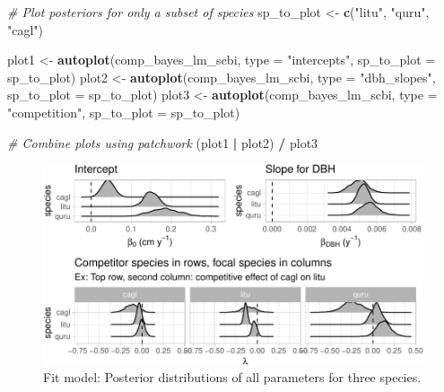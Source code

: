 \documentclass[12pt]{article}
\newenvironment{Shaded}{\begin{snugshade}}{\end{snugshade}}
\newcommand{\CommentTok}[1]{\textcolor[rgb]{0.56,0.35,0.01}{\textit{#1}}}
\newcommand{\DataTypeTok}[1]{\textcolor[rgb]{0.13,0.29,0.53}{#1}}
\newcommand{\KeywordTok}[1]{\textcolor[rgb]{0.13,0.29,0.53}{\textbf{#1}}}
\newcommand{\NormalTok}[1]{#1}
\newcommand{\OperatorTok}[1]{\textcolor[rgb]{0.81,0.36,0.00}{\textbf{#1}}}
\newcommand{\StringTok}[1]{\textcolor[rgb]{0.31,0.60,0.02}{#1}}
\begin{document}
\begin{Shaded}
\begin{Highlighting}[]
\CommentTok{# Plot posteriors for only a subset of species}
\NormalTok{sp_to_plot <-}\StringTok{ }\KeywordTok{c}\NormalTok{(}\StringTok{"litu"}\NormalTok{, }\StringTok{"quru"}\NormalTok{, }\StringTok{"cagl"}\NormalTok{)}

\NormalTok{plot1 <-}\StringTok{ }\KeywordTok{autoplot}\NormalTok{(comp_bayes_lm_scbi, }\DataTypeTok{type =} \StringTok{"intercepts"}\NormalTok{, }
                  \DataTypeTok{sp_to_plot =}\NormalTok{ sp_to_plot)}
\NormalTok{plot2 <-}\StringTok{ }\KeywordTok{autoplot}\NormalTok{(comp_bayes_lm_scbi, }\DataTypeTok{type =} \StringTok{"dbh_slopes"}\NormalTok{, }
                  \DataTypeTok{sp_to_plot =}\NormalTok{ sp_to_plot)}
\NormalTok{plot3 <-}\StringTok{ }\KeywordTok{autoplot}\NormalTok{(comp_bayes_lm_scbi, }\DataTypeTok{type =} \StringTok{"competition"}\NormalTok{, }
                  \DataTypeTok{sp_to_plot =}\NormalTok{ sp_to_plot)}

\CommentTok{# Combine plots using patchwork}
\NormalTok{(plot1 }\OperatorTok{|}\StringTok{ }\NormalTok{plot2) }\OperatorTok{/}\StringTok{ }\NormalTok{plot3}
\end{Highlighting}
\end{Shaded}

\begin{figure}

{\centering \includegraphics[width=1\linewidth]{Figures/scbi-posterior-viz-1} 

}

\caption{Fit model: Posterior distributions of all parameters for three species.}\label{fig:scbi-posterior-viz}
\end{figure}
\end{document}
